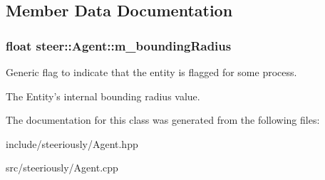 \subsection{Member Data Documentation}
\hypertarget{classsteer_1_1_agent_aec01d1d8d1d1e75714ccc41e2a9d2c8f}{
\subsubsection[{m\-\_\-bounding\-Radius}]{\setlength{\rightskip}{0pt plus 5cm}float steer\-::\-Agent\-::m\-\_\-bounding\-Radius}}\label{classsteer_1_1_agent_aec01d1d8d1d1e75714ccc41e2a9d2c8f}


Generic flag to indicate that the entity is flagged for some process. 

The Entity's internal bounding radius value. 

The documentation for this class was generated from the following files\-:\begin{DoxyCompactItemize}
\item 
include/steeriously/Agent.\-hpp\item 
src/steeriously/Agent.\-cpp\end{DoxyCompactItemize}
